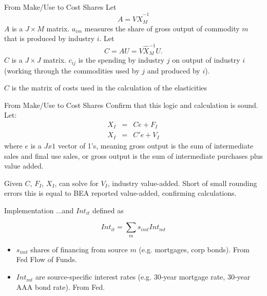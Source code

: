 \documentclass[10pt,xcolor=dvipsnames]{beamer}
\begin{document}
\begin{frame}{From Make/Use to Cost Shares}
Let
\begin{equation}
  A = V \hat{X}_M^{-1}
\end{equation}
$A$ is a $J \times M$ matrix. $a_{im}$ measures the share of gross output of commodity $m$ that is produced by industry $i$. 
\vspace{.25in}
Let
\begin{equation}
  C = A U =  V \hat{X}_M^{-1} U.
\end{equation}
$C$ is a $J \times J$ matrix. $c_{ij}$ is the spending by industry $j$ on output of industry $i$ (working through the commodities used by $j$ and produced by $i$). 

\vspace{.25in}

$C$ is the matrix of costs used in the calculation of the elasticities
\end{frame}

\begin{frame}{From Make/Use to Cost Shares}
Confirm that this logic and calculation is sound. Let:
\begin{eqnarray}
  X_I &=& Ce + F_I \\
  X_I &=& C'e + V_I
\end{eqnarray}
where $e$ is a $Jx1$ vector of 1's, meaning gross output is the sum of intermediate sales and final use sales, or gross output is the sum of intermediate purchases plus value added.

\vspace{.25in}

Given $C$, $F_I$, $X_I$, can solve for $V_I$, industry value-added. Short of small rounding errors this is equal to BEA reported value-added, confirming calculations.

\vspace{.25in} \hfill \hyperlink{Smakeuse}{}
\end{frame}

\begin{frame}{Implementation}\label{Ausercost}
...and $Int_{it}$ defined as

\begin{equation}
    Int_{it} = \sum_m s_{imt} Int_{mt}
\end{equation} 

\begin{itemize}
  \item $s_{imt}$ shares of financing from source $m$ (e.g. mortgages, corp bonds). From Fed Flow of Funds.
  \item $Int_{mt}$ are source-specific interest rates (e.g. 30-year mortgage rate, 30-year AAA bond rate). From Fed.
\end{itemize}

\end{frame}
\end{document}
